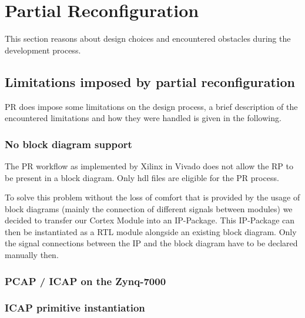 \section{Partial Reconfiguration}
This section reasons about design choices and encountered obstacles during the development process.

\subsection{Limitations imposed by partial reconfiguration}
\gls{PR} does impose some limitations on the design process, a brief description of the encountered limitations and how they were handled is given in the following.

\subsubsection{No block diagram support}
The \gls{PR} workflow as implemented by Xilinx in Vivado does not allow the \gls{RP} to be present in a block diagram.
Only hdl files are eligible for the \gls{PR} process.

To solve this problem without the loss of comfort that is provided by the usage of block diagrams (mainly the connection of different signals between modules) we decided to transfer our Cortex Module into an \gls{IP}-Package.
This \gls{IP}-Package can then be instantiated as a \gls{RTL} module alongside an existing block diagram.
Only the signal connections between the \gls{IP} and the block diagram have to be declared manually then.

\subsubsection{\gls{PCAP} / \gls{ICAP} on the Zynq-7000}

\subsubsection{\gls{ICAP} primitive instantiation}
